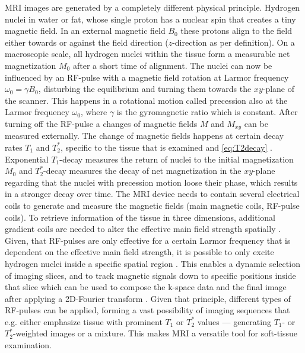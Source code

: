         \ac{MRI} images are generated by a completely different physical principle. Hydrogen nuclei in water or fat, whose single proton has a nuclear spin that creates a tiny magnetic field. In an external magnetic field $B_0$ these protons align to the field either towards or against the field direction \citep{ridgway2010cardiovascular} ($z$-direction as per definition). On a macroscopic scale, all hydrogen nuclei within the tissue form a measurable net magnetization $M_0$ after a short time of alignment. The nuclei can now be influenced by an \ac{RF}-pulse with a magnetic field rotation at Larmor frequency $\omega_0 = \gamma B_0$, disturbing the equilibrium and turning them towards the $xy$-plane of the scanner. This happens in a rotational motion called precession also at the Larmor frequency $\omega_0$, where $\gamma$ is the gyromagnetic ratio which is constant. After turning off the \ac{RF}-pulse a changes of magnetic fields $M$ and $M_{xy}$ can be measured externally. The change of magnetic fields happens at certain decay rates $T_1$ and $T_2^*$, specific to the tissue that is examined  and \eqref{eq:T2decay} \citep{withers2021x}. Exponential $T_1$-decay measures the return of nuclei to the initial magnetization $M_0$ and $T_2^*$-decay measures the decay of net magnetization in the $xy$-plane regarding that the nuclei with precession motion loose their phase, which results in a stronger decay over time.
        The MRI device needs to contain several electrical coils to generate and measure the magnetic fields (main magnetic coils, \ac{RF}-pulse coils). To retrieve information of the tissue in three dimensions, additional gradient coils are needed to alter the effective main field strength spatially \citep{ridgway2010cardiovascular}. Given, that \ac{RF}-pulses are only effective for a certain Larmor frequency that is dependent on the effective main field strength, it is possible to only excite hydrogen nuclei inside a specific spatial region \citep{ridgway2010cardiovascular}. This enables a dynamic selection of imaging slices, and to track magnetic signals down to specific positions inside that slice which can be used to compose the k-space data and the final image after applying a \ac{2D}-Fourier transform \citep{ridgway2010cardiovascular}.
        Given that principle, different types of \ac{RF}-pulses can be applied, forming a vast possibility of imaging sequences that e.g. either emphasize tissue with prominent $T_1$ or $T_2^*$ values --- generating $T_1$- or $T_2^*$-weighted images or a mixture. This makes \ac{MRI} a versatile tool for soft-tissue examination.

